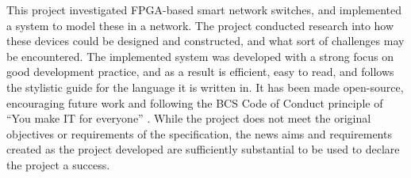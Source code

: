 


This project investigated FPGA-based smart network switches, and implemented a system to model these in a network.
The project conducted research into how these devices could be designed and constructed, and what sort of challenges may be encountered.
The implemented system was developed with a strong focus on good development practice, and as a result is efficient, easy to read, and follows the stylistic guide for the language it is written in.
It has been made open-source, encouraging future work and following the BCS Code of Conduct principle of ``You make IT for everyone'' \cite{bcs_code_of_conduct}.
While the project does not meet the original objectives or requirements of the specification, the news aims and requirements created as the project developed are sufficiently substantial to be used to declare the project a success.
